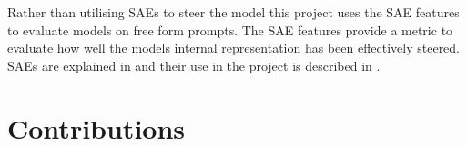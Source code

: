 Rather than utilising SAEs to steer the model this project uses the SAE features to evaluate models on free form prompts.
The SAE features provide a metric to evaluate how well the models internal representation has been effectively steered.
SAEs are explained in  and their use in the project is described in .

\section{Contributions}
\label{sec:contributions}
